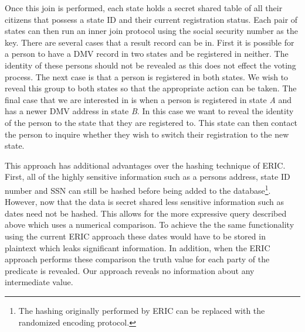 \documentclass[11pt,letterpaper]{article}
\begin{document}
Once this join is performed, each state holds a secret shared table of all their citizens that possess a state ID and their current registration status. Each pair of states can then run an inner join protocol using the social security number as the key. There are several cases that a result record can be in. First it is possible for a person to have a DMV record in two states and be registered in neither. The identity of these persons should not be revealed as this does not effect the voting process. The next case is that a person is registered in both states. We wish to reveal this group to both states so that the appropriate action can be taken. The final case that we are interested in is when a person is registered in state \emph{A} and has a newer DMV address in state \emph{B}. In this case we want to reveal the identity of the person to the state that they are registered to. This state can then contact the person to inquire whether they wish to switch their registration to the new state. 


This approach has additional advantages over the hashing technique of ERIC. First, all of the highly sensitive information such as a persons address, state ID number and SSN can still be hashed before being added to the database\footnote{The hashing originally performed by ERIC can be replaced with the randomized encoding protocol.}. However, now that the data is secret shared less sensitive information such as dates need not be hashed. This allows for the more expressive query described above which uses a numerical comparison. To achieve the the same functionality using the current ERIC approach these dates would have to be stored in plaintext which leaks significant information. In addition, when the ERIC approach performs these comparison the truth value for each party of the predicate is revealed. Our approach reveals no information about any intermediate value. 
\end{document}
